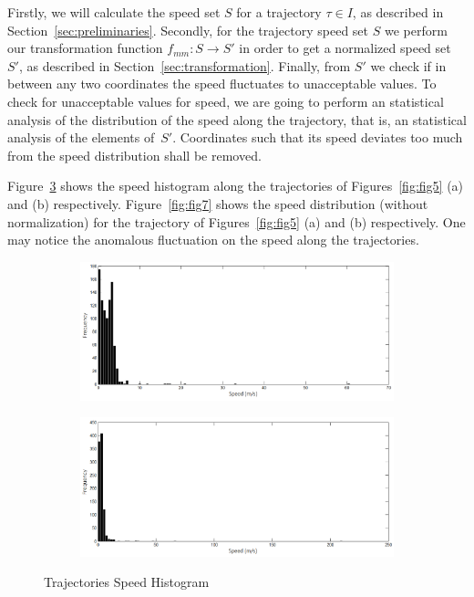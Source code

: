\documentclass[a4paper,12pt]{article}
\begin{document}
Firstly, we will calculate the speed set $S$ for a trajectory $\tau \in I$, as described in Section~\ref{sec:preliminaries}. Secondly, for the trajectory speed set $S$ we perform our transformation function $f_{mm} : S \rightarrow S'$ in order to get a normalized speed set $S'$, as described in Section~\ref{sec:transformation}. Finally, from $S'$ we check if in between any two coordinates the speed fluctuates to unacceptable values. To check for unacceptable values for speed, we are going to perform an statistical analysis of the distribution of the speed along the trajectory, that is, an statistical analysis of the elements of~$S'$. Coordinates such that its speed deviates too much from the speed distribution shall be removed.	

Figure~\ref{fig:fig6} shows the speed histogram along the trajectories of Figures~\ref{fig:fig5} (a) and (b) respectively. Figure~\ref{fig:fig7} shows the speed distribution (without normalization) for the trajectory of Figures~\ref{fig:fig5} (a) and (b) respectively. One may notice the anomalous fluctuation on the speed along the trajectories.
	
\begin{figure}[!h]
\begin{subfigure}{\textwidth}
 \label{fig:fig6a}
 \includegraphics[scale=0.53]{hist1}
 \caption{}
\end{subfigure}
 
\begin{subfigure}{\textwidth}
 \label{fig:fig6b}
 \includegraphics[scale=0.53]{hist2}
 \caption{}
\end{subfigure}
\caption{Trajectories Speed Histogram}
\label{fig:fig6}
\end{figure}
\end{document}
